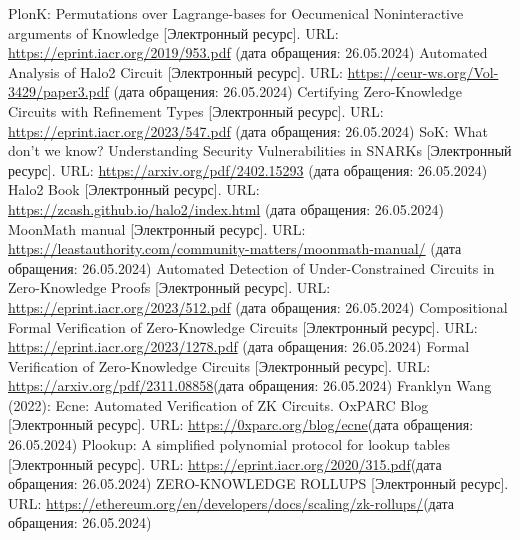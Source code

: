 \documentclass[a4paper]{article}
\begin{document}
\begin{thebibliography}{}
      PlonK: Permutations over Lagrange-bases for Oecumenical Noninteractive arguments of Knowledge [Электронный ресурс]. URL: \href{https://eprint.iacr.org/2019/953.pdf}{https://eprint.iacr.org/2019/953.pdf} (дата обращения: 26.05.2024)
      Automated Analysis of Halo2 Circuit [Электронный ресурс]. URL: \href{https://ceur-ws.org/Vol-3429/paper3.pdf}{https://ceur-ws.org/Vol-3429/paper3.pdf} (дата обращения: 26.05.2024)
      Certifying Zero-Knowledge Circuits with Refinement Types [Электронный ресурс]. URL: \href{https://eprint.iacr.org/2023/547.pdf}{https://eprint.iacr.org/2023/547.pdf} (дата обращения: 26.05.2024)
      SoK: What don’t we know? Understanding Security Vulnerabilities in SNARKs [Электронный ресурс]. URL: \href{https://arxiv.org/pdf/2402.15293}{https://arxiv.org/pdf/2402.15293} (дата обращения: 26.05.2024)
      Halo2 Book [Электронный ресурс]. 
    URL: \href{https://zcash.github.io/halo2/index.html}{https://zcash.github.io/halo2/index.html}
    (дата обращения: 26.05.2024)
      MoonMath manual [Электронный ресурс]. URL: \href{https://leastauthority.com/community-matters/moonmath-manual/}{https://leastauthority.com/community-matters/moonmath-manual/} (дата обращения: 26.05.2024)
      Automated Detection of Under-Constrained Circuits in Zero-Knowledge Proofs [Электронный ресурс]. URL: \href{https://eprint.iacr.org/2023/512.pdf}{https://eprint.iacr.org/2023/512.pdf} (дата обращения: 26.05.2024)
      Compositional Formal Verification
    of Zero-Knowledge Circuits [Электронный ресурс]. URL: \href{https://eprint.iacr.org/2023/1278.pdf}{https://eprint.iacr.org/2023/1278.pdf} (дата обращения: 26.05.2024)
      Formal Verification of Zero-Knowledge Circuits [Электронный ресурс]. URL: \href{https://arxiv.org/pdf/2311.08858}{https://arxiv.org/pdf/2311.08858}(дата обращения: 26.05.2024)
      Franklyn Wang (2022): Ecne: Automated Verification of ZK Circuits. OxPARC Blog [Электронный ресурс]. URL: \href{https://0xparc.org/blog/ecne}{https://0xparc.org/blog/ecne}(дата обращения: 26.05.2024)
      Plookup: A simplified polynomial protocol for
    lookup tables [Электронный ресурс]. URL: \href{https://eprint.iacr.org/2020/315.pdf}{https://eprint.iacr.org/2020/315.pdf}(дата обращения: 26.05.2024)
      ZERO-KNOWLEDGE ROLLUPS [Электронный ресурс]. URL: \href{https://ethereum.org/en/developers/docs/scaling/zk-rollups/}{https://ethereum.org/en/developers/docs/scaling/zk-rollups/}(дата обращения: 26.05.2024)

\end{thebibliography}
\end{document}
